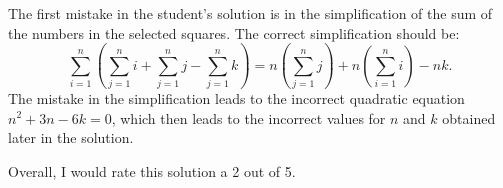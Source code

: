 The first mistake in the student's solution is in the simplification of the sum of the numbers in the selected squares. The correct simplification should be:
\[\sum_{i=1}^{n} \left( \sum_{j=1}^{n} i + \sum_{j=1}^{n} j - \sum_{j=1}^{n} k \right) = n\left(\sum_{j=1}^{n} j\right) + n\left(\sum_{i=1}^{n} i\right) - nk.\]
The mistake in the simplification leads to the incorrect quadratic equation \(n^2 + 3n - 6k = 0\), which then leads to the incorrect values for \(n\) and \(k\) obtained later in the solution.

Overall, I would rate this solution a 2 out of 5.

